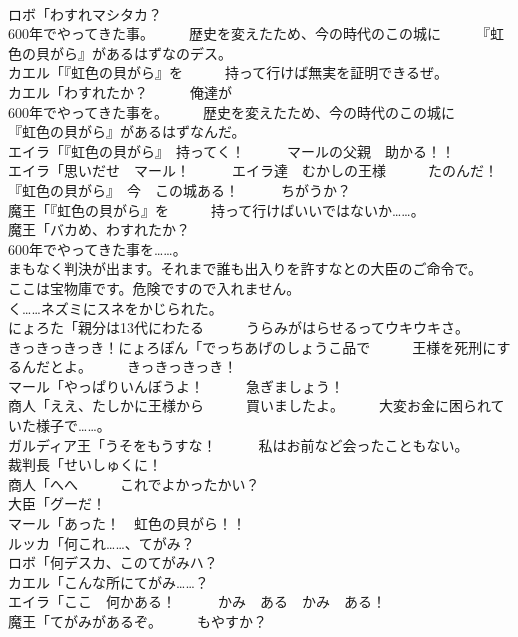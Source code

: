 \documentclass[8pt]{extreport}
\begin{document}
\begin{CJK}{UTF8}{min}
\\	ロボ「わすれマシタカ？　　　
\\	600年でやってきた事。　　　歴史を変えたため、今の時代のこの城に　　　『虹色の貝がら』があるはずなのデス。	
\\	カエル「『虹色の貝がら』を　　　持って行けば無実を証明できるぜ。	
\\	カエル「わすれたか？　　　俺達が
\\	600年でやってきた事を。　　　歴史を変えたため、今の時代のこの城に　　　『虹色の貝がら』があるはずなんだ。	
\\	エイラ「『虹色の貝がら』　持ってく！　　　マールの父親　助かる！！	
\\	エイラ「思いだせ　マール！　　　エイラ達　むかしの王様　　　たのんだ！　　　『虹色の貝がら』　今　この城ある！　　　ちがうか？	
\\	魔王「『虹色の貝がら』を　　　持って行けばいいではないか……。	
\\	魔王「バカめ、わすれたか？　　　
\\	600年でやってきた事を……。	
\\	まもなく判決が出ます。それまで誰も出入りを許すなとの大臣のご命令で。	
\\	ここは宝物庫です。危険ですので入れません。	
\\	く……ネズミにスネをかじられた。	
\\	にょろた「親分は13代にわたる　　　うらみがはらせるってウキウキさ。　　　きっきっきっき！にょろぽん「でっちあげのしょうこ品で　　　王様を死刑にするんだとよ。　　　きっきっきっき！	
\\	マール「やっぱりいんぼうよ！　　　急ぎましょう！	
\\	商人「ええ、たしかに王様から　　　買いましたよ。　　　大変お金に困られていた様子で……。	
\\	ガルディア王「うそをもうすな！　　　私はお前など会ったこともない。	
\\	裁判長「せいしゅくに！	
\\	商人「へへ　　　これでよかったかい？	
\\	大臣「グーだ！	
\\	マール「あった！　虹色の貝がら！！	
\\	ルッカ「何これ……、てがみ？	
\\	ロボ「何デスカ、このてがみハ？	
\\	カエル「こんな所にてがみ……？	
\\	エイラ「ここ　何かある！　　　かみ　ある　かみ　ある！	
\\	魔王「てがみがあるぞ。　　　もやすか？	

\end{CJK}
\end{document}
